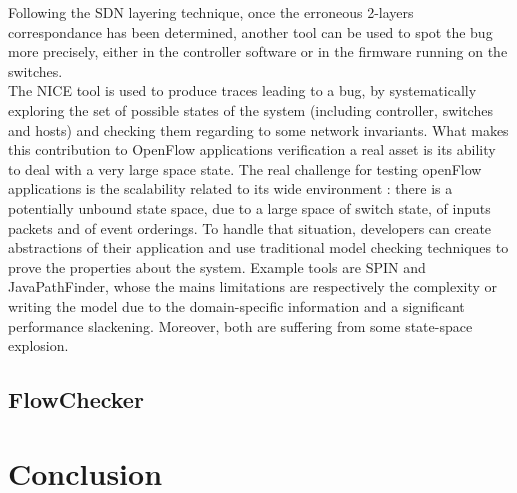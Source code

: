 \documentclass[10pt,article]{IEEEtran}
\begin{document}
Following the SDN layering technique, once the erroneous 2-layers correspondance has been determined, another tool can be used to spot the bug more precisely, either in the controller software or in the firmware running on the switches.\\
The NICE tool is used to produce traces leading to a bug, by systematically exploring the set of possible states of the system (including controller, switches and hosts) and checking them regarding to some network invariants\cite{Canini:2012:NWT:2228298.2228312}. What makes this contribution to OpenFlow applications verification a real asset is its ability to deal with a very large space state. The real challenge for testing openFlow applications is the scalability related to its wide environment : there is a potentially unbound state space, due to a large space of switch state, of inputs packets and of event orderings\cite{Canini:2012:NWT:2228298.2228312}. To handle that situation, developers can create abstractions of their application and use traditional model checking techniques to prove the properties about the system. Example tools are SPIN and JavaPathFinder, whose the mains limitations are respectively the complexity or writing the model due to the domain-specific information and a significant performance slackening\cite{Peresini:2011:YOA:2079327.2079345}. Moreover, both are suffering from some state-space explosion.\\


\subsection{FlowChecker}




\section{Conclusion}




\end{document}
